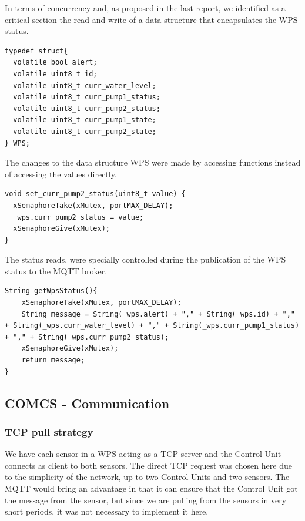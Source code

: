 \documentclass[11pt]{article}
\begin{document}
In terms of concurrency and, as proposed in the last report, we identified as a critical section the read and write of a data structure that encapsulates the WPS status.

\begin{verbatim}
typedef struct{
  volatile bool alert;
  volatile uint8_t id;
  volatile uint8_t curr_water_level;
  volatile uint8_t curr_pump1_status;
  volatile uint8_t curr_pump2_status;  
  volatile uint8_t curr_pump1_state;
  volatile uint8_t curr_pump2_state;
} WPS;
\end{verbatim}

The changes to the data structure WPS were made by accessing functions instead of accessing the values directly.

\begin{verbatim}
void set_curr_pump2_status(uint8_t value) {
  xSemaphoreTake(xMutex, portMAX_DELAY);
  _wps.curr_pump2_status = value;
  xSemaphoreGive(xMutex);
}
\end{verbatim}

The status reads, were specially controlled during the publication of the WPS status to the MQTT broker.

\begin{verbatim}
String getWpsStatus(){
    xSemaphoreTake(xMutex, portMAX_DELAY);
    String message = String(_wps.alert) + "," + String(_wps.id) + "," + String(_wps.curr_water_level) + "," + String(_wps.curr_pump1_status) + "," + String(_wps.curr_pump2_status);
    xSemaphoreGive(xMutex);
    return message;
}
\end{verbatim}

\subsection{COMCS - Communication}

\subsubsection{TCP pull strategy}

We have each sensor in a WPS acting as a TCP server and the Control Unit connects as client to both sensors.
The direct TCP request was chosen here due to the simplicity of the network, up to two Control Units and two sensors. The MQTT would bring an advantage in that it can ensure that the Control Unit got the message from the sensor, but since we are pulling from the sensors in very short periods, it was not necessary to implement it here.
\end{document}
